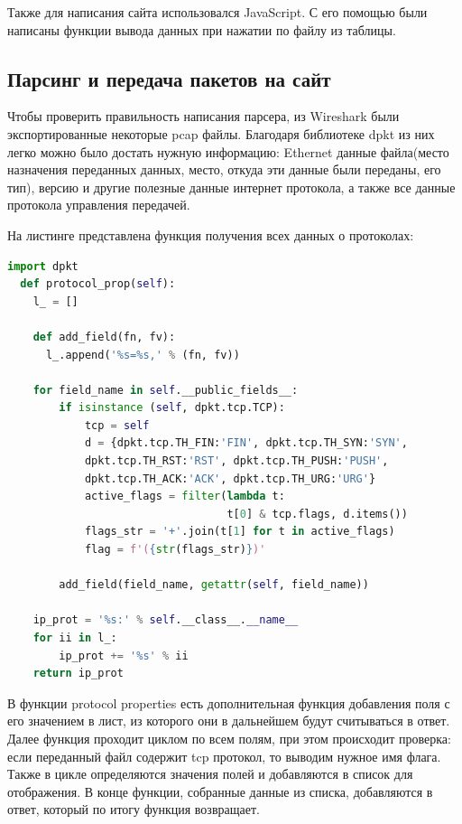 Также для написания сайта использовался JavaScript. С его помощью были написаны функции вывода данных при нажатии по файлу из таблицы.



\subsection{Парсинг и передача пакетов на сайт} 
Чтобы проверить правильность написания парсера, из Wireshark были экспортированные некоторые pcap файлы.
Благодаря библиотеке dpkt из них легко можно было достать нужную информацию:
Ethernet данные файла(место назначения переданных данных,
место, откуда эти данные были переданы, его тип),
версию и другие полезные данные интернет протокола,
а также все данные протокола управления передачей.

На листинге представлена функция получения всех данных о протоколах:
\begin{lstlisting}[caption=\textbf{Получение данных из протоколов}, language=Python, frame=single]
  import dpkt
  def protocol_prop(self):
    l_ = []
    
    def add_field(fn, fv):
      l_.append('%s=%s,' % (fn, fv))

    for field_name in self.__public_fields__:
        if isinstance (self, dpkt.tcp.TCP):
            tcp = self
            d = {dpkt.tcp.TH_FIN:'FIN', dpkt.tcp.TH_SYN:'SYN', 
            dpkt.tcp.TH_RST:'RST', dpkt.tcp.TH_PUSH:'PUSH', 
            dpkt.tcp.TH_ACK:'ACK', dpkt.tcp.TH_URG:'URG'}
            active_flags = filter(lambda t: 
                                  t[0] & tcp.flags, d.items())
            flags_str = '+'.join(t[1] for t in active_flags)
            flag = f'({str(flags_str)})'

        add_field(field_name, getattr(self, field_name))

    ip_prot = '%s:' % self.__class__.__name__  
    for ii in l_:
        ip_prot += '%s' % ii
    return ip_prot
\end{lstlisting}
В функции protocol properties есть дополнительная функция добавления поля с его значением в лист, из которого они в дальнейшем будут считываться в ответ.
Далее функция проходит циклом по всем полям, при этом происходит проверка: если переданный файл содержит tcp протокол, то выводим нужное имя флага.
Также в цикле определяются значения полей и добавляются в список для отображения.
В конце функции, собранные данные из списка, добавляются в ответ, который по итогу функция возвращает. 

